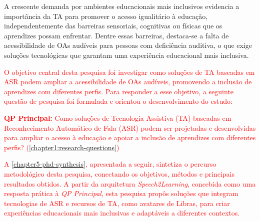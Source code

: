 A crescente demanda por ambientes educacionais mais inclusivos evidencia a importância da TA para promover o acesso igualitário à educação, independentemente das barreiras sensoriais, cognitivas ou físicas que os aprendizes possam enfrentar. Dentre essas barreiras, destaca-se a falta de acessibilidade de OAs audíveis para pessoas com deficiência auditiva, o que exige soluções tecnológicas que garantam uma experiência educacional mais inclusiva.

\textcolor{red}{O objetivo central desta pesquisa foi investigar como soluções de TA baseadas em ASR podem ampliar a acessibilidade de OAs audíveis, promovendo a inclusão de aprendizes com diferentes perfis. Para responder a esse objetivo, a seguinte questão de pesquisa foi formulada e orientou o desenvolvimento do estudo:}

\begin{citacao}
\textcolor{red}{\textbf{QP Principal:} Como soluções de Tecnologia Assistiva (TA) baseadas em Reconhecimento Automático de Fala (ASR) podem ser projetadas e desenvolvidas para ampliar o acesso à educação e apoiar a inclusão de aprendizes com diferentes perfis? (\autoref{chapter1:research-questions})}
\end{citacao}

\textcolor{red}{A \autoref{chapter5-phd-synthesis}, apresentada a seguir, sintetiza o percurso metodológico desta pesquisa, conectando os objetivos, métodos e principais resultados obtidos. A partir da arquitetura \textit{Speech2Learning}, concebida como uma resposta prática à \textit{QP Principal}, esta pesquisa propôs soluções que integram tecnologias de ASR e recursos de TA, como avatares de Libras, para criar experiências educacionais mais inclusivas e adaptáveis a diferentes contextos.}

